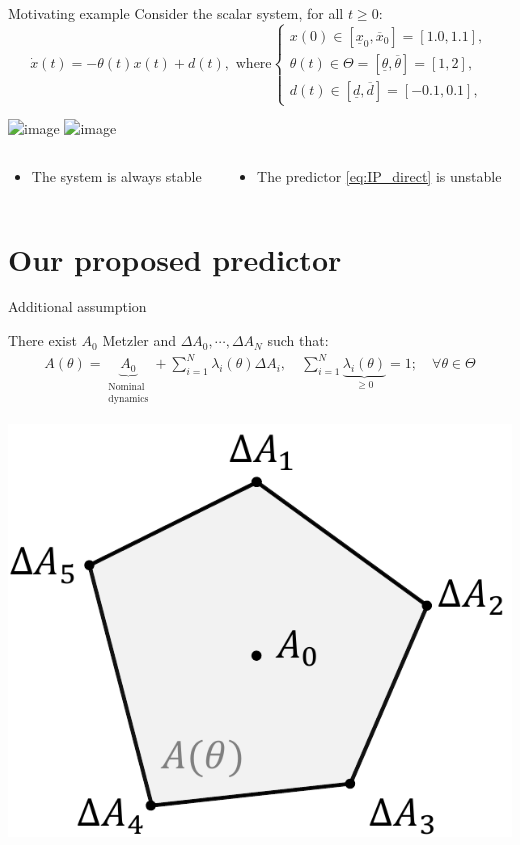 \documentclass[slideopt,A4,showboxes,svgnames]{beamer}
\begin{document}
\begin{frame}{Motivating example}
Consider the scalar system, for all $t\geq0$:
\[
	\dot{x}(t)=-\theta(t)x(t)+d(t), \text{ where} 
	\begin{cases}
	x(0)\in[\underline{x}_{0},\overline{x}_{0}]=[1.0, 1.1],\\
	\theta(t)\in\Theta=[\underline{\theta},\overline{\theta}]=[1,2],\\
	d(t)\in[\underline{d},\overline{d}]=[-0.1,0.1],
	\end{cases}
\]
\begin{center}
\includegraphics<1>[trim={0 1.4cm 0 0.4cm}, clip, width=0.7\linewidth]{img/system}
\includegraphics<2>[trim={0 1.4cm 0 0.4cm}, clip, width=0.7\linewidth]{img/observer}
\end{center}

\begin{columns}
	\begin{column}{0.48\linewidth}
		\begin{itemize}
			\item[{\green \checkmark}] The system is always {\green stable}
		\end{itemize}
	\end{column}
	\begin{column}{0.52\linewidth}
		\begin{itemize}
			\item<2>[{\red \xmark}] The predictor \eqref{eq:IP_direct} is {\red unstable}
		\end{itemize}
	\end{column}
\end{columns}

\end{frame}

\section{Our proposed predictor}
\frame{\sectionpage}


\begin{frame}{Additional assumption}
\begin{assumption}
	\label{ass:a3} There exist $A_{0}$ \alert{Metzler} and $\Delta A_{0}, \cdots, \Delta A_{N}$ such that:
	\begin{gather*}
	A(\theta)=\underbrace{A_{0}}_{\substack{\text{Nominal}\\\text{dynamics}}} + \sum_{i=1}^{N}\lambda_{i}(\theta)\Delta A_{i},\quad \sum_{i=1}^{N}\underbrace{\lambda_{i}(\theta)}_{\geq 0}=1;\quad \forall\theta\in\Theta
	\end{gather*}
\end{assumption}
\centering
\includegraphics[width=0.42\linewidth]{img/polytope}
\end{frame}
\end{document}
